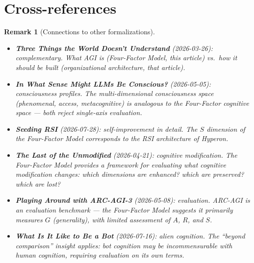 \documentclass[11pt,a4paper]{article}
\newtheorem{remark}[definition]{Remark}
\begin{document}

\section{Cross-references}

\begin{remark}[Connections to other formalizations]
\begin{itemize}
\item \textbf{Three Things the World Doesn't Understand} (2026-03-26):
  complementary. What AGI is (Four-Factor Model, this article) vs.\
  how it should be built (organizational architecture, that article).
\item \textbf{In What Sense Might LLMs Be Conscious?} (2026-05-05):
  consciousness profiles. The multi-dimensional consciousness space
  (phenomenal, access, metacognitive) is analogous to the Four-Factor
  cognitive space --- both reject single-axis evaluation.
\item \textbf{Seeding RSI} (2026-07-28): self-improvement in detail.
  The $S$ dimension of the Four-Factor Model corresponds to the RSI
  architecture of Hyperon.
\item \textbf{The Last of the Unmodified} (2026-04-21): cognitive
  modification. The Four-Factor Model provides a framework for
  evaluating what cognitive modification changes: which dimensions
  are enhanced? which are preserved? which are lost?
\item \textbf{Playing Around with ARC-AGI-3} (2026-05-08): evaluation.
  ARC-AGI is an evaluation benchmark --- the Four-Factor Model suggests
  it primarily measures $G$ (generality), with limited assessment of
  $A$, $R$, and $S$.
\item \textbf{What Is It Like to Be a Bot} (2026-07-16): alien cognition.
  The ``beyond comparison'' insight applies: bot cognition may be
  incommensurable with human cognition, requiring evaluation on its
  own terms.
\end{itemize}
\end{remark}
\end{document}
